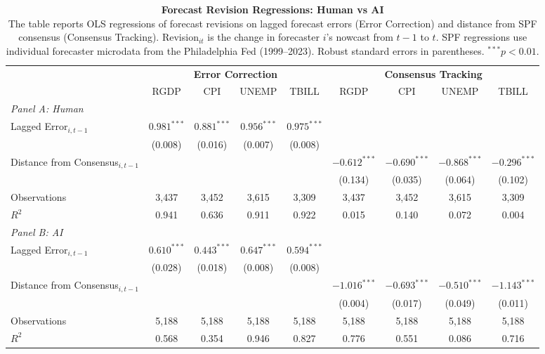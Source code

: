 \documentclass[11pt,letterpaper]{scrartcl}
\begin{document}
\begin{table}[t]
\centering
\caption{\textbf{Forecast Revision Regressions: Human vs AI}
\vspace{10pt}\\
{\footnotesize 
The table reports OLS regressions of forecast revisions on lagged forecast errors (Error Correction) and distance from SPF consensus (Consensus Tracking). Revision$_{it}$ is the change in forecaster $i$'s nowcast from $t-1$ to $t$. SPF regressions use individual forecaster microdata from the Philadelphia Fed (1999--2023). Robust standard errors in parentheses. $^{***}p<0.01$.}
}
\label{tab:revision_regressions}
\footnotesize
\begin{tabular}{lcccccccc}
\toprule
& \multicolumn{4}{c}{\textbf{Error Correction}} & \multicolumn{4}{c}{\textbf{Consensus Tracking}} \\
\cmidrule(lr){2-5} \cmidrule(lr){6-9}
& RGDP & CPI & UNEMP & TBILL & RGDP & CPI & UNEMP & TBILL \\
\midrule
\multicolumn{9}{l}{\textit{Panel A: Human}} \\[3pt]
Lagged Error$_{i,t-1}$ & $0.981^{***}$ & $0.881^{***}$ & $0.956^{***}$ & $0.975^{***}$ & & & & \\
 & (0.008) & (0.016) & (0.007) & (0.008) & & & & \\[3pt]
Distance from Consensus$_{i,t-1}$ & & & & & $-0.612^{***}$ & $-0.690^{***}$ & $-0.868^{***}$ & $-0.296^{***}$ \\
 & & & & & (0.134) & (0.035) & (0.064) & (0.102) \\[3pt]
Observations & 3,437 & 3,452 & 3,615 & 3,309 & 3,437 & 3,452 & 3,615 & 3,309 \\
$R^2$ & 0.941 & 0.636 & 0.911 & 0.922 & 0.015 & 0.140 & 0.072 & 0.004 \\
\midrule
\multicolumn{9}{l}{\textit{Panel B: AI}} \\[3pt]
Lagged Error$_{i,t-1}$ & $0.610^{***}$ & $0.443^{***}$ & $0.647^{***}$ & $0.594^{***}$ & & & & \\
 & (0.028) & (0.018) & (0.008) & (0.008) & & & & \\[3pt]
Distance from Consensus$_{i,t-1}$ & & & & & $-1.016^{***}$ & $-0.693^{***}$ & $-0.510^{***}$ & $-1.143^{***}$ \\
 & & & & & (0.004) & (0.017) & (0.049) & (0.011) \\[3pt]
Observations & 5,188 & 5,188 & 5,188 & 5,188 & 5,188 & 5,188 & 5,188 & 5,188 \\
$R^2$ & 0.568 & 0.354 & 0.946 & 0.827 & 0.776 & 0.551 & 0.086 & 0.716 \\
\bottomrule
\end{tabular}
\end{table}
\clearpage
\end{document}

